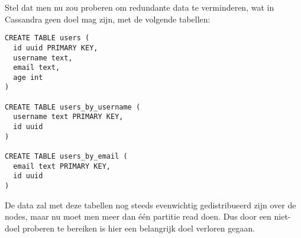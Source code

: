 Stel dat men nu zou proberen om redundante data te verminderen, wat in Cassandra geen doel mag zijn, met de volgende tabellen:

\begin{lstlisting}
CREATE TABLE users (
  id uuid PRIMARY KEY,
  username text,
  email text,
  age int
)

CREATE TABLE users_by_username (
  username text PRIMARY KEY,
  id uuid
)

CREATE TABLE users_by_email (
  email text PRIMARY KEY,
  id uuid
)
\end{lstlisting}

De data zal met deze tabellen nog steeds evenwichtig gedistribueerd zijn over de nodes, maar nu moet men meer dan één partitie read doen.
Dus door een niet-doel proberen te bereiken is hier een belangrijk doel verloren gegaan.